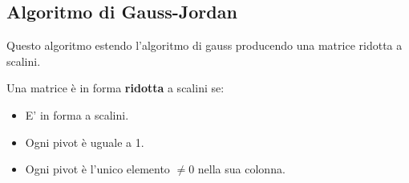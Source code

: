 \subsection{Algoritmo di Gauss-Jordan}
Questo algoritmo estendo l'algoritmo di gauss producendo una matrice ridotta a scalini.
\begin{definition}
Una matrice è in forma \textbf{ridotta} a scalini se:
\begin{itemize}
    \item E' in forma a scalini.
    \item Ogni pivot è uguale a 1.
    \item Ogni pivot è l'unico elemento $\neq 0$ nella sua colonna.
\end{itemize}
\end{definition}

